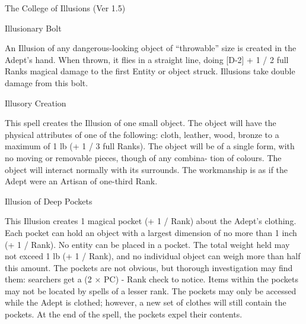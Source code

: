 \begin{Chapter}{The College of Illusions (Ver 1.5)}
\begin{spell}[S-2]{Illusionary Bolt}

\begin{effects}
An Illusion of any dangerous-looking object of “throwable” size is
created in the Adept’s hand. When thrown, it flies in a straight line,
doing [D-2] + 1 / 2 full Ranks magical damage to the first Entity or
object struck.  Illusions take double damage from this bolt.
\end{effects}
\end{spell}

\begin{spell}[S-3]{Illusory Creation}

\begin{effects}
This spell creates the Illusion of one small object. The object will
have the physical attributes of one of the following: cloth, leather,
wood, bronze to a maximum of 1 lb (+ 1 / 3 full Ranks).  The object
will be of a single form, with no moving or removable pieces, though
of any combina- tion of colours.  The object will interact normally
with its surrounds.  The workmanship is as if the Adept were an
Artisan of one-third Rank.
\end{effects}
\end{spell}

\begin{spell}[S-4]{Illusion of Deep Pockets}

\begin{effects}
This Illusion creates 1 magical pocket (+ 1 / Rank) about the Adept’s
clothing.  Each pocket can hold an object with a largest dimension of
no more than 1 inch (+ 1 / Rank).  No entity can be placed in a
pocket.  The total weight held may not exceed 1 lb (+ 1 / Rank), and
no individual object can weigh more than half this amount. The pockets
are not obvious, but thorough investigation may find them: searchers
get a (2 × PC) - Rank check to notice. Items within the pockets may
not be located by spells of a lesser rank. The pockets may only be
accessed while the Adept is clothed; however, a new set of clothes
will still contain the pockets. At the end of the spell, the pockets
expel their contents.
\end{effects}
\end{spell}


\end{Chapter}
